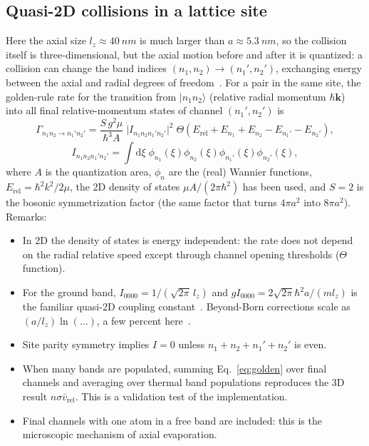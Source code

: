 \documentclass[11pt,a4paper]{article}
\newcommand{\dd}{\mathrm{d}}
\begin{document}
\subsection{Quasi-2D collisions in a lattice site}
Here the axial size $l_z\approx\SI{40}{nm}$ is much larger than $a\approx\SI{5.3}{nm}$, so the collision itself is three-dimensional, but the axial motion before and after it is quantized: a collision can change the band indices $(n_1,n_2)\to(n_1',n_2')$, exchanging energy between the axial and radial degrees of freedom~\cite{Petrov2000,Petrov2001}. For a pair in the same site, the golden-rule rate for the transition from $|n_1n_2\rangle$ (relative radial momentum $\hbar\bm k$) into all final relative-momentum states of channel $(n_1',n_2')$ is
\begin{equation}
\Gamma_{n_1n_2\to n_1'n_2'}=\frac{S\,g^2\mu}{\hbar^3 A}\;\big|I_{n_1n_2n_1'n_2'}\big|^2\;
\Theta\!\left(E_\mathrm{rel}+E_{n_1}+E_{n_2}-E_{n_1'}-E_{n_2'}\right),
\label{eq:golden}
\end{equation}
\begin{equation}
I_{n_1n_2n_1'n_2'}=\int\dd\xi\;\phi_{n_1}(\xi)\phi_{n_2}(\xi)\phi_{n_1'}(\xi)\phi_{n_2'}(\xi),
\end{equation}
where $A$ is the quantization area, $\phi_n$ are the (real) Wannier functions, $E_\mathrm{rel}=\hbar^2k^2/2\mu$, the 2D density of states $\mu A/(2\pi\hbar^2)$ has been used, and $S=2$ is the bosonic symmetrization factor (the same factor that turns $4\pi a^2$ into $8\pi a^2$). Remarks:
\begin{itemize}[leftmargin=*]
\item In 2D the density of states is energy independent: the rate does not depend on the radial relative speed except through channel opening thresholds ($\Theta$ function).
\item For the ground band, $I_{0000}=1/(\sqrt{2\pi}\,l_z)$ and $gI_{0000}=2\sqrt{2\pi}\hbar^2a/(m l_z)$ is the familiar quasi-2D coupling constant~\cite{Petrov2000}. Beyond-Born corrections scale as $(a/l_z)\ln(\dots)$, a few percent here~\cite{Petrov2001}.
\item Site parity symmetry implies $I=0$ unless $n_1+n_2+n_1'+n_2'$ is even.
\item When many bands are populated, summing Eq.~\eqref{eq:golden} over final channels and averaging over thermal band populations reproduces the 3D result $n\sigma\bar v_\mathrm{rel}$. This is a validation test of the implementation.
\item Final channels with one atom in a free band are included: this is the microscopic mechanism of axial evaporation.
\end{itemize}
\end{document}
